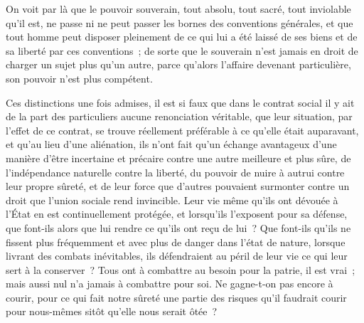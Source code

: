 \documentclass[french,twoside]{book} %
\begin{document}
On voit par là que le pouvoir souverain, tout absolu, tout sacré, tout inviolable qu’il est, ne passe ni ne peut passer les bornes des conventions générales, et que tout homme peut disposer pleinement de ce qui lui a été laissé de ses biens et de sa liberté par ces conventions ; de sorte que le souverain n’est jamais en droit de charger un sujet plus qu’un autre, parce qu’alors l’affaire devenant particulière, son pouvoir n’est plus compétent.\par
Ces distinctions une fois admises, il est si faux que dans le contrat social il y ait de la part des particuliers aucune renonciation véritable, que leur situation, par l’effet de ce contrat, se trouve réellement préférable à ce qu’elle était auparavant, et qu’au lieu d’une aliénation, ils n’ont fait qu’un échange avantageux d’une manière d’être incertaine et précaire contre une autre meilleure et plus sûre, de l’indépendance naturelle contre la liberté, du pouvoir de nuire à autrui contre leur propre sûreté, et de leur force que d’autres pouvaient surmonter contre un droit que l’union sociale rend invincible. Leur vie même qu’ils ont dévouée à l’État en est continuellement protégée, et lorsqu’ils l’exposent pour sa défense, que font-ils alors que lui rendre ce qu’ils ont reçu de lui ? Que font-ils qu’ils ne fissent plus fréquemment et avec plus de danger dans l’état de nature, lorsque livrant des combats inévitables, ils défendraient au péril de leur vie ce qui leur sert à la conserver ? Tous ont à combattre au besoin pour la patrie, il est vrai ; mais aussi nul n’a jamais à combattre pour soi. Ne gagne-t-on pas encore à courir, pour ce qui fait notre sûreté une partie des risques qu’il faudrait courir pour nous-mêmes sitôt qu’elle nous serait ôtée ?
\end{document}
